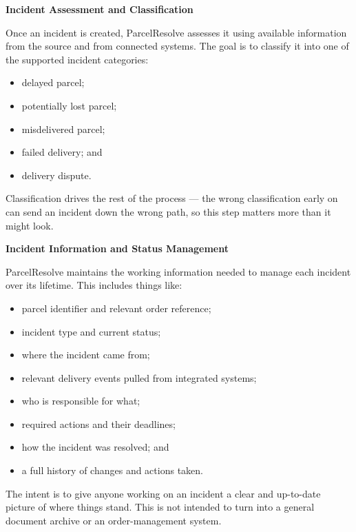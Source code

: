 \documentclass[11pt,a4paper]{article}
\begin{document}

\textbf{Incident Assessment and Classification}

Once an incident is created, ParcelResolve assesses it using
available information from the source and from connected systems.
The goal is to classify it into one of the supported incident
categories:

\begin{itemize}
    \item delayed parcel;
    \item potentially lost parcel;
    \item misdelivered parcel;
    \item failed delivery; and
    \item delivery dispute.
\end{itemize}

Classification drives the rest of the process --- the wrong
classification early on can send an incident down the wrong path,
so this step matters more than it might look.


\textbf{Incident Information and Status Management}

ParcelResolve maintains the working information needed to manage
each incident over its lifetime. This includes things like:

\begin{itemize}
    \item parcel identifier and relevant order reference;
    \item incident type and current status;
    \item where the incident came from;
    \item relevant delivery events pulled from integrated systems;
    \item who is responsible for what;
    \item required actions and their deadlines;
    \item how the incident was resolved; and
    \item a full history of changes and actions taken.
\end{itemize}

The intent is to give anyone working on an incident a clear and
up-to-date picture of where things stand. This is not intended to
turn into a general document archive or an order-management system.

\end{document}
